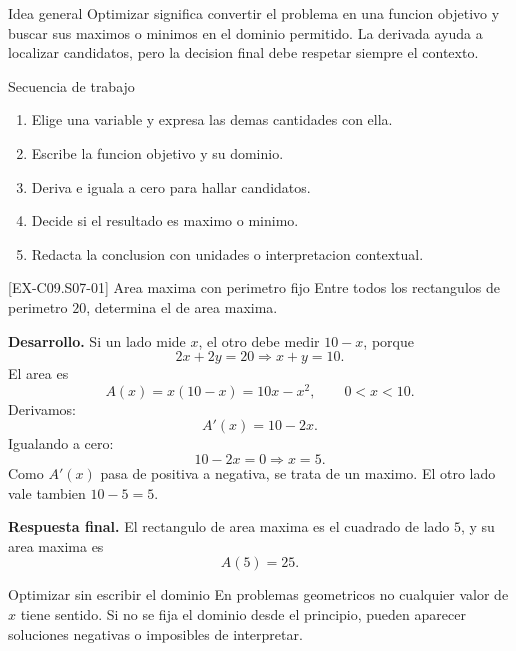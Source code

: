 \begin{theorybox}{Idea general}
Optimizar significa convertir el problema en una funcion objetivo y buscar sus maximos o
minimos en el dominio permitido. La derivada ayuda a localizar candidatos, pero la decision
final debe respetar siempre el contexto.
\end{theorybox}

\begin{methodbox}{Secuencia de trabajo}
\begin{enumerate}
  \item Elige una variable y expresa las demas cantidades con ella.
  \item Escribe la funcion objetivo y su dominio.
  \item Deriva e iguala a cero para hallar candidatos.
  \item Decide si el resultado es maximo o minimo.
  \item Redacta la conclusion con unidades o interpretacion contextual.
\end{enumerate}
\end{methodbox}

\begin{center}
\end{center}

\begin{solvedexample}{[EX-C09.S07-01] Area maxima con perimetro fijo}
Entre todos los rectangulos de perimetro \(20\), determina el de area maxima.

\textbf{Desarrollo.} Si un lado mide \(x\), el otro debe medir \(10-x\), porque
\[
2x+2y=20 \Longrightarrow x+y=10.
\]
El area es
\[
A(x)=x(10-x)=10x-x^2,\qquad 0<x<10.
\]
Derivamos:
\[
A'(x)=10-2x.
\]
Igualando a cero:
\[
10-2x=0 \Longrightarrow x=5.
\]
Como \(A'(x)\) pasa de positiva a negativa, se trata de un maximo. El otro lado vale tambien
\(10-5=5\).

\textbf{Respuesta final.} El rectangulo de area maxima es el cuadrado de lado \(5\), y su area
maxima es
\[
A(5)=25.
\]
\end{solvedexample}

\begin{commonerror}{Optimizar sin escribir el dominio}
En problemas geometricos no cualquier valor de \(x\) tiene sentido. Si no se fija el dominio
desde el principio, pueden aparecer soluciones negativas o imposibles de interpretar.
\end{commonerror}

